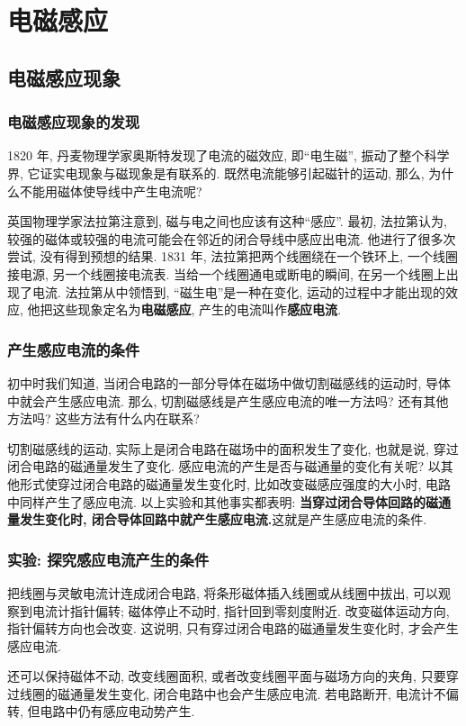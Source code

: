 \documentclass[UTF8,openany,fontset=fandol]{ctexbook}
\theoremstyle{chinesetextbook}
\begin{document}
\chapter{电磁感应}
\section{电磁感应现象}\label{sec:电磁感应1}
\subsection{电磁感应现象的发现}
1820 年, 丹麦物理学家奥斯特发现了电流的磁效应, 即“电生磁”, 振动了整个科学界, 它证实电现象与磁现象是有联系的. 既然电流能够引起磁针的运动, 那么, 为什么不能用磁体使导线中产生电流呢?

英国物理学家法拉第注意到, 磁与电之间也应该有这种“感应”. 最初, 法拉第认为, 较强的磁体或较强的电流可能会在邻近的闭合导线中感应出电流. 他进行了很多次尝试, 没有得到预想的结果. 1831 年, 法拉第把两个线圈绕在一个铁环上, 一个线圈接电源, 另一个线圈接电流表. 当给一个线圈通电或断电的瞬间, 在另一个线圈上出现了电流. 法拉第从中领悟到, “磁生电”是一种在变化, 运动的过程中才能出现的效应, 他把这些现象定名为\textbf{电磁感应}, 产生的电流叫作\textbf{感应电流}.
\subsection{产生感应电流的条件}
初中时我们知道, 当闭合电路的一部分导体在磁场中做切割磁感线的运动时, 导体中就会产生感应电流. 那么, 切割磁感线是产生感应电流的唯一方法吗? 还有其他方法吗? 这些方法有什么内在联系?

切割磁感线的运动, 实际上是闭合电路在磁场中的面积发生了变化, 也就是说, 穿过闭合电路的磁通量发生了变化. 感应电流的产生是否与磁通量的变化有关呢? 以其他形式使穿过闭合电路的磁通量发生变化时, 比如改变磁感应强度的大小时, 电路中同样产生了感应电流. 以上实验和其他事实都表明: \textbf{当穿过闭合导体回路的磁通量发生变化时, 闭合导体回路中就产生感应电流.}这就是产生感应电流的条件.
\subsection{实验: 探究感应电流产生的条件}
把线圈与灵敏电流计连成闭合电路, 将条形磁体插入线圈或从线圈中拔出, 可以观察到电流计指针偏转; 磁体停止不动时, 指针回到零刻度附近. 改变磁体运动方向, 指针偏转方向也会改变. 这说明, 只有穿过闭合电路的磁通量发生变化时, 才会产生感应电流.

还可以保持磁体不动, 改变线圈面积, 或者改变线圈平面与磁场方向的夹角, 只要穿过线圈的磁通量发生变化, 闭合电路中也会产生感应电流. 若电路断开, 电流计不偏转, 但电路中仍有感应电动势产生.
\end{document}
